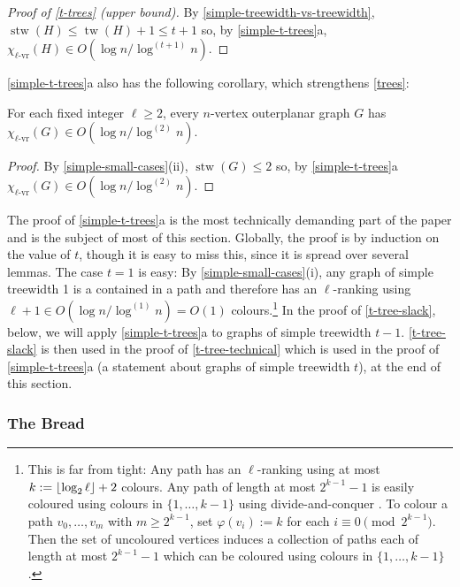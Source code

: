 \documentclass[kpfonts]{patmorin}
\DeclareMathOperator{\tw}{tw}
\DeclareMathOperator{\stw}{stw}
\newcommand{\rn}[1]{\chi_{\operatorname{#1-vr}}}
\newcommand{\lrn}{\rn{\ell}}
\theoremstyle{named}
\newcommand{\weirdref}[2]{\cref{#1}#2}
\begin{document}
\begin{proof}[Proof of \cref{t-trees} (upper bound)]
    By \cref{simple-treewidth-vs-treewidth}, $\stw(H)\le\tw(H)+1\le t+1$ so, by   \weirdref{simple-t-trees}{a}, $\lrn(H)\in O(\log n/\log^{(t+1)}n)$.
\end{proof}

\weirdref{simple-t-trees}{a} also has the following corollary, which strengthens \cref{trees}:

\begin{cor}\label{outerplanar}
    For each fixed integer $\ell\ge 2$, every $n$-vertex outerplanar graph $G$ has $\lrn(G)\in O(\log n/\log^{(2)} n)$.
\end{cor}

\begin{proof}
    By \cref{simple-small-cases}{(ii)}, $\stw(G)\le 2$ so, by \weirdref{simple-t-trees}{a} $\lrn(G)\in O(\log n/\log^{(2)} n)$.
\end{proof}

The proof of \weirdref{simple-t-trees}{a} is the most technically demanding part of the paper and is the subject of most of this section.  Globally, the proof is by induction on the value of $t$, though it is easy to miss this, since it is spread over several lemmas. The case $t=1$ is easy: By \cref{simple-small-cases}(i), any graph of simple treewidth 1 is a contained in a path and therefore has an $\ell$-ranking using $\ell+1\in O(\log n/\log^{(1)} n) = O(1)$ colours.\footnote{\label{logarithmic-base-case}This is far from tight: Any path has an $\ell$-ranking using at most $k:={\lfloor \log_2 \ell \rfloor}+2$ colours.  Any path of length at most $2^{k-1}-1$ is easily coloured using colours in $\{1,\ldots,k-1\}$ using divide-and-conquer \cite{nesetril.ossona:tree-depth}.  To colour a path $v_0,\ldots,v_m$ with $m\ge 2^{k-1}$, set $\varphi(v_i):=k$ for each $i\equiv 0\pmod{2^{k-1}}$.  Then the set of uncoloured vertices induces a collection of paths each of length at most $2^{k-1}-1$ which can be coloured using colours in $\{1,\ldots,k-1\}$.}  In the proof of \cref{t-tree-slack}, below, we will apply \weirdref{simple-t-trees}{a} to graphs of simple treewidth $t-1$. \cref{t-tree-slack} is then used in the proof of \cref{t-tree-technical} which is used in the proof of \weirdref{simple-t-trees}{a} (a statement about graphs of simple treewidth $t$), at the end of this section.

\subsubsection{The Bread}
\end{document}
